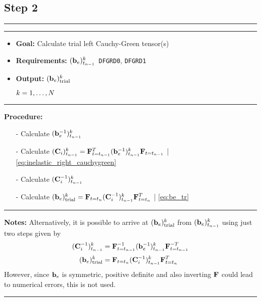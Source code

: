 \subsection*{Step 2}
\vspace{0.1cm}
\hrule
\vspace{0.1cm}
\hrule
\begin{itemize}
    \item \textbf{Goal:} Calculate trial left Cauchy-Green tensor(s)
    \item \textbf{Requirements:} \(({\mathbf{b}_{e}})^{k}_{t_{n-1}}\)\, \texttt{DFGRD0}, \texttt{DFGRD1}
    \item \textbf{Output:} \(({\mathbf{b}_{e}})_\text{trial}^{k}\)
    \item[] \( \hfill  k=1,\ldots,N \)
\end{itemize}
\vspace{0.1cm}
\hrule
\textbf{Procedure:}
\begin{itemize}
    \item[-] Calculate \((\mathbf{b}_{e}^{-1})^{k}_{t_{n-1}}\)
    \item[-] Calculate \((\mathbf{C}_{i})^{k}_{t_{n-1}} = \mathbf{F}^{T}_{t=t_{n-1}} (\mathbf{b}_{e}^{-1})^{k}_{t_{n-1}} \mathbf{F}_{t=t_{n-1}}\) \hfill | \cref{eq:inelastic_right_cauchygreen}
    \item[-] Calculate \((\mathbf{C}_{i}^{-1})^{k}_{t_{n-1}}\)
    \item[-] Calculate \(({\mathbf{b}_{e}})_\text{trial}^{k}  = \mathbf{F}_{t=t_{n}} (\mathbf{C}_{i}^{-1})^{k}_{t_{n-1}} \mathbf{F}^{T}_{t=t_{n}}\) \hfill | \cref{eq:be_tr}
\end{itemize}
\vspace{0.1cm}
\hrule
\textbf{Notes:} \newline
Alternatively, it is possible to arrive at \(({\mathbf{b}_{e}})_\text{trial}^{k}\) from \((\mathbf{b}_{e})^{k}_{t_{n-1}}\) using just two steps given by
 \begin{align*}
    (\mathbf{C}_{i}^{-1})^{k}_{t_{n-1}} &= \mathbf{F}^{-1}_{t=t_{n-1}} (\mathbf{b}_{e}^{-1})^{k}_{t_{n-1}} \mathbf{F}^{-T}_{t=t_{n-1}} \\[0.2em]
    ({\mathbf{b}_{e}})_\text{trial}^{k}  &= \mathbf{F}_{t=t_{n}} (\mathbf{C}_{i}^{-1})^{k}_{t_{n-1}} \mathbf{F}^{T}_{t=t_{n}} 
\end{align*}
However, since \(\mathbf{b}_{e}\) is symmetric, positive definite and also inverting \(\mathbf{F}\) could lead to numerical errors, this is not used.
\vspace{0.1cm}
\hrule
\vspace{0.8cm}

